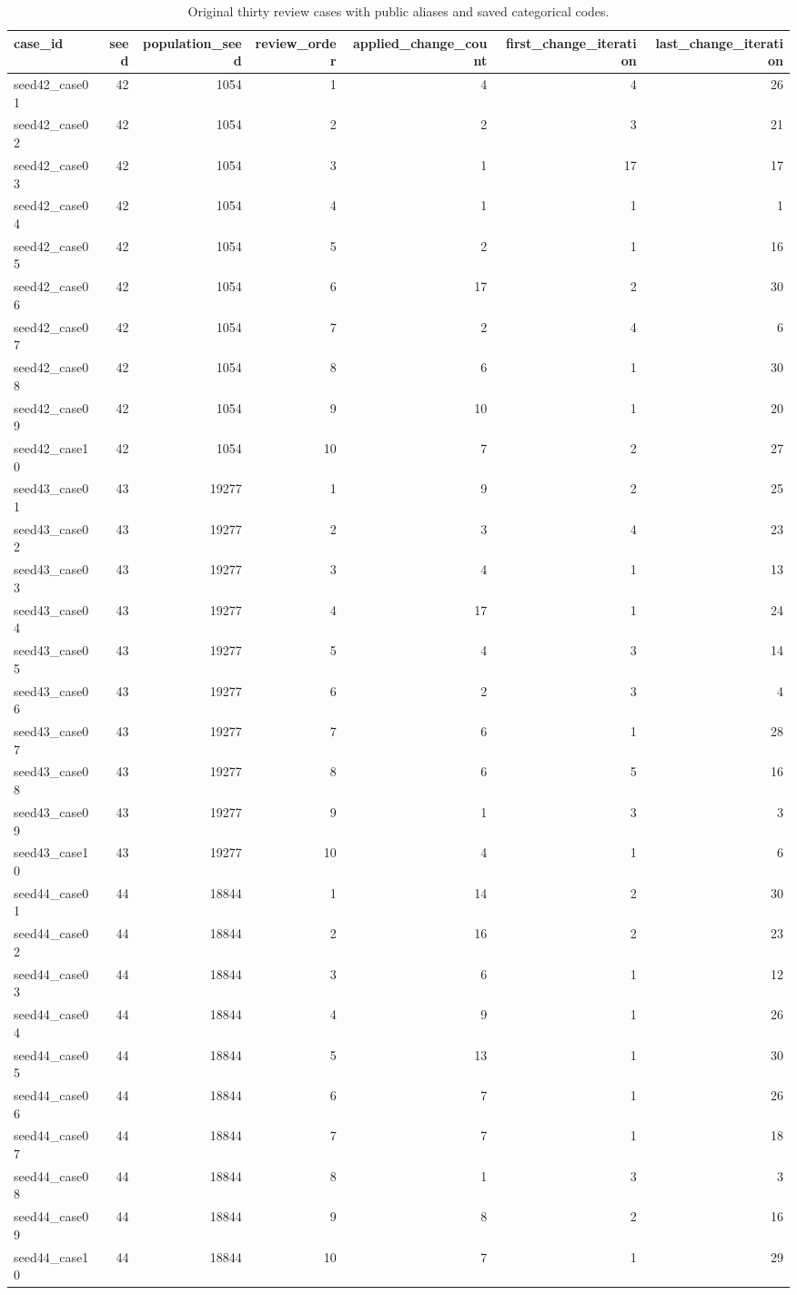 \begin{table}[htbp!]
\centering
\small
\setlength{\tabcolsep}{3pt}
\renewcommand{\arraystretch}{1.1}
\begin{tabular}{lrrrrrr}
\hline
case\_id & seed & population\_seed & review\_order & applied\_change\_count & first\_change\_iteration & last\_change\_iteration \\
\hline
seed42\_case01 & 42 & 1054 & 1 & 4 & 4 & 26 \\
seed42\_case02 & 42 & 1054 & 2 & 2 & 3 & 21 \\
seed42\_case03 & 42 & 1054 & 3 & 1 & 17 & 17 \\
seed42\_case04 & 42 & 1054 & 4 & 1 & 1 & 1 \\
seed42\_case05 & 42 & 1054 & 5 & 2 & 1 & 16 \\
seed42\_case06 & 42 & 1054 & 6 & 17 & 2 & 30 \\
seed42\_case07 & 42 & 1054 & 7 & 2 & 4 & 6 \\
seed42\_case08 & 42 & 1054 & 8 & 6 & 1 & 30 \\
seed42\_case09 & 42 & 1054 & 9 & 10 & 1 & 20 \\
seed42\_case10 & 42 & 1054 & 10 & 7 & 2 & 27 \\
seed43\_case01 & 43 & 19277 & 1 & 9 & 2 & 25 \\
seed43\_case02 & 43 & 19277 & 2 & 3 & 4 & 23 \\
seed43\_case03 & 43 & 19277 & 3 & 4 & 1 & 13 \\
seed43\_case04 & 43 & 19277 & 4 & 17 & 1 & 24 \\
seed43\_case05 & 43 & 19277 & 5 & 4 & 3 & 14 \\
seed43\_case06 & 43 & 19277 & 6 & 2 & 3 & 4 \\
seed43\_case07 & 43 & 19277 & 7 & 6 & 1 & 28 \\
seed43\_case08 & 43 & 19277 & 8 & 6 & 5 & 16 \\
seed43\_case09 & 43 & 19277 & 9 & 1 & 3 & 3 \\
seed43\_case10 & 43 & 19277 & 10 & 4 & 1 & 6 \\
seed44\_case01 & 44 & 18844 & 1 & 14 & 2 & 30 \\
seed44\_case02 & 44 & 18844 & 2 & 16 & 2 & 23 \\
seed44\_case03 & 44 & 18844 & 3 & 6 & 1 & 12 \\
seed44\_case04 & 44 & 18844 & 4 & 9 & 1 & 26 \\
seed44\_case05 & 44 & 18844 & 5 & 13 & 1 & 30 \\
seed44\_case06 & 44 & 18844 & 6 & 7 & 1 & 26 \\
seed44\_case07 & 44 & 18844 & 7 & 7 & 1 & 18 \\
seed44\_case08 & 44 & 18844 & 8 & 1 & 3 & 3 \\
seed44\_case09 & 44 & 18844 & 9 & 8 & 2 & 16 \\
seed44\_case10 & 44 & 18844 & 10 & 7 & 1 & 29 \\
\hline
\end{tabular}
\caption{Original thirty review cases with public aliases and saved categorical codes.}
\label{chap:results:tab:rq3_profile_review_case_index}
\end{table}
